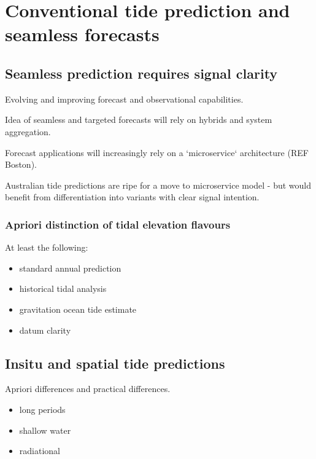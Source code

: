 \chapter{Conventional tide prediction and seamless forecasts}

\section{Seamless prediction requires signal clarity}

Evolving and improving forecast and observational capabilities.

Idea of seamless and targeted forecasts will rely on hybrids and system aggregation. 


Forecast applications will increasingly rely on a `microservice` architecture (REF Boston).

Australian tide predictions are ripe for a move to microservice model - but would benefit from differentiation into variants with clear signal intention.
\subsection{Apriori distinction of tidal elevation flavours}
At least the following:
\begin{itemize}
    \item standard annual prediction
    \item historical tidal analysis
    \item gravitation ocean tide estimate
    \item datum clarity
\end{itemize}

\section{Insitu and spatial tide predictions}

Apriori differences and practical differences.

\begin{itemize}
    \item long periods
    \item shallow water
    \item radiational
\end{itemize}

